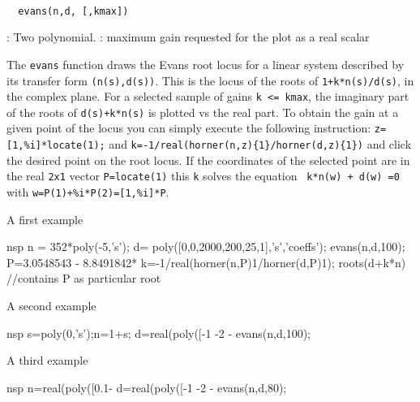 \begin{mandesc}
  \\ %
\end{mandesc}
\begin{calling_sequence}
\begin{verbatim}
  evans(n,d, [,kmax])
\end{verbatim}
\end{calling_sequence}
\begin{parameters}
  \begin{varlist}
    : Two polynomial.
    : maximum gain requested for the plot as a real scalar
  \end{varlist}
\end{parameters}

\begin{mandescription}
  The \verb!evans! function draws the Evans root locus for a linear system
  described by its transfer form \verb!(n(s),d(s))!. This is the locus of the
  roots of \verb!1+k*n(s)/d(s)!, in the complex plane. For a selected sample of
  gains \verb!k <= kmax!, the imaginary part of the roots of \verb!d(s)+k*n(s)!
  is plotted vs the real part. To obtain the gain at a given point of the locus
  you can simply execute the following instruction: \verb!z=[1,%i]*locate(1);!
  and \verb!k=-1/real(horner(n,z){1}/horner(d,z){1})!
  and click the desired point on the root locus. If the coordinates of the
  selected point are in the real \verb!2x1! vector \verb!P=locate(1)! this \verb!k!
  solves the equation \verb! k*n(w) + d(w) =0! with
  \verb!w=P(1)+%i*P(2)=[1,%i]*P!.
\end{mandescription}
\begin{examples}

  \noindent A first example
  \begin{mintednsp}{nsp}
    n = 352*poly(-5,'s'); d= poly([0,0,2000,200,25,1],'s','coeffs');
    evans(n,d,100);
    P=3.0548543 - 8.8491842*%
    k=-1/real(horner(n,P){1}/horner(d,P){1});
    roots(d+k*n)     //contains P as particular root
  \end{mintednsp}

  \noindent A second example
  \begin{mintednsp}{nsp}
    s=poly(0,'s');n=1+s;
    d=real(poly([-1 -2 -%
    evans(n,d,100);
  \end{mintednsp}
  \noindent A third example
  \begin{mintednsp}{nsp}
    n=real(poly([0.1-%
    d=real(poly([-1 -2 -%
    evans(n,d,80);
  \end{mintednsp}
\end{examples}
\begin{manseealso}
    
\end{manseealso}
